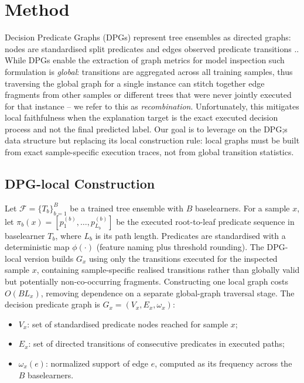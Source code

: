 \documentclass[runningheads]{llncs}
\begin{document}
\section{Method}


Decision Predicate Graphs (DPGs) represent tree ensembles as directed graphs: nodes are standardised split predicates and edges observed predicate transitions \cite{arrighi2024decision,ceschin2025extending}..  While DPGs enable the extraction of graph metrics for model inspection such formulation is \emph{global}: transitions are aggregated across all training samples, thus traversing the global graph for a single instance can stitch together edge fragments from other samples or different trees that were never jointly executed for that instance -- we refer to this as \emph{recombination}. Unfortunately, this mitigates local faithfulness when the explanation target is the exact executed decision process and not the final predicted label. Our goal is to leverage on the DPG;s data structure but replacing its local construction rule: local graphs must be built from exact sample-specific execution traces, not from global transition statistics.

\subsection{DPG-local Construction}
\label{sec:dpg-construction}

Let $\mathcal{F}=\{T_b\}_{b=1}^B$ be a trained tree ensemble with $B$ baselearners. For a sample $x$, let $\pi_b(x)=[p^{(b)}_1,\dots,p^{(b)}_{L_b}]$ be the executed root-to-leaf predicate sequence in baselearner $T_b$, where $L_b$ is its path length. Predicates are standardised with a deterministic map $\phi(\cdot)$ (feature naming plus threshold rounding).
The DPG-local version builds $G_x$ using only the transitions executed for the inspected sample $x$, containing sample-specific realised transitions rather than globally valid but potentially non-co-occurring fragments. Constructing one local graph costs $O(BL_x)$, removing dependence on a separate global-graph traversal stage. The decision predicate graph is $G_x=(V_x,E_x,\omega_x)$:
\begin{itemize}
  \item $V_x$: set of standardised predicate nodes reached for sample $x$;
  \item $E_x$: set of directed transitions of consecutive predicates in executed paths;
  \item $\omega_x(e)$: normalized support of edge $e$, computed as its frequency across the $B$ baselearners.
\end{itemize}
\end{document}
